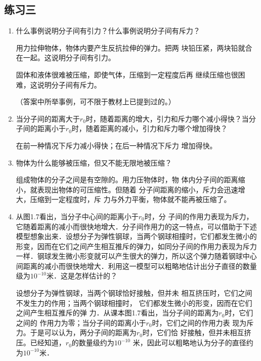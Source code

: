 \subsection{练习三}
\begin{enumerate}
	\item 什么事例说明分子间有引力？什么事例说明分子间有斥力？
	
\begin{solution}
    用力拉伸物体，物体内要产生反抗拉伸的弹力。把两
    块铅压紧，两块铅就合在一起。这说明分子间有引力。

    固体和液体很难被压缩，即使气体，压缩到一定程度后再
    继续压缩也很困难，这说明分子间有斥力。

    （答案中所举事例，可不限于教材上已提到过的。）
\end{solution}
	\item 当分子间的距离大于$r_0$时，随着距离的增大，引力和斥力哪个减小得快？当分子间的距离小于$r_0$时，随着距离的减小，引力和斥力哪个增加得快？
		
\begin{solution}
在前一种情况下斥力减小得快；在后一种情况下斥力
增加得快。
\end{solution}
	\item 物体为什么能够被压缩，但又不能无限地被压缩？
		
\begin{solution}
    组成物体的分子之间是有空隙的。用力压物体时，物
    体内分子间的距离缩小，就表现出物体的可压缩性。但随着
    分子间距离的缩小，斥力会迅速增大，压缩到一定程度时，斥
    力与外力平衡，物体就不能再被压缩了。
\end{solution}
\item	从图1.7看出，当分子中心间的距离小于$r_0$时，分
子间的作用力表现为斥力，它随着距离的减小而很快地增大．分子间作用力的这一特点，可以借助于下述模型想象出来．设想分子为弹性钢球，当两个钢球相撞时，它们都发生微小的形变，因而在它们之间产生相互推斥的弹力，如同分子间的作用力表现为斥力一样．钢球发生微小形变就可以产生很大的弹力，所以这个弹力随着钢球中心间距离的减小而很快地增大．利用这一模型可以粗略地估计出分子直径的数量级为$10^{-10}$米．这是怎样估计的？
	
\begin{solution}
    设想分子为弹性钢球，当两个钢球恰好接触，但并未
    相互挤压时，它们之间不发生力的作用；当两个钢球相撞时，
    它们都发生微小的形变，因而在它们之间产生相互推斥的弹
    力．从课本图1.7看出，当分子间的距离为$r_0$时，它们之间的
    作用力为零；当分子间的距离小于$r_0$时，它们之间的作用力表
    现为斥力。于是可以认为，两分子间的距离为$r_0$时，它们恰
    好接触，但并未相互挤压。已经知道，$r_0$的数量级约为$10^{-10}$
    米，因此可以粗略地认为分子的直径约为$10^{-10}$米．
\end{solution}
\end{enumerate}

